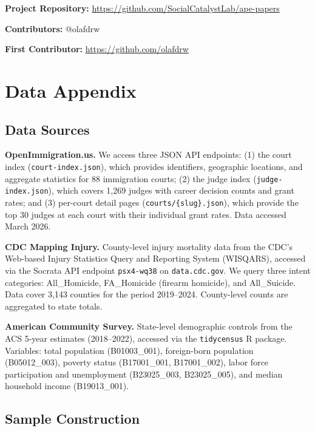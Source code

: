 \documentclass[12pt]{article}
\begin{document}
\noindent\textbf{Project Repository:} \url{https://github.com/SocialCatalystLab/ape-papers}

\noindent\textbf{Contributors:} @olafdrw

\noindent\textbf{First Contributor:} \url{https://github.com/olafdrw}

\label{apep_main_text_end}
\newpage


\newpage
\appendix

\section{Data Appendix}

\subsection{Data Sources}

\textbf{OpenImmigration.us.} We access three JSON API endpoints: (1) the court index (\texttt{court-index.json}), which provides identifiers, geographic locations, and aggregate statistics for 88 immigration courts; (2) the judge index (\texttt{judge-index.json}), which covers 1,269 judges with career decision counts and grant rates; and (3) per-court detail pages (\texttt{courts/\{slug\}.json}), which provide the top 30 judges at each court with their individual grant rates. Data accessed March 2026.

\textbf{CDC Mapping Injury.} County-level injury mortality data from the CDC's Web-based Injury Statistics Query and Reporting System (WISQARS), accessed via the Socrata API endpoint \texttt{psx4-wq38} on \texttt{data.cdc.gov}. We query three intent categories: All\_Homicide, FA\_Homicide (firearm homicide), and All\_Suicide. Data cover 3,143 counties for the period 2019--2024. County-level counts are aggregated to state totals.

\textbf{American Community Survey.} State-level demographic controls from the ACS 5-year estimates (2018--2022), accessed via the \texttt{tidycensus} R package. Variables: total population (B01003\_001), foreign-born population (B05012\_003), poverty status (B17001\_001, B17001\_002), labor force participation and unemployment (B23025\_003, B23025\_005), and median household income (B19013\_001).

\subsection{Sample Construction}
\end{document}
